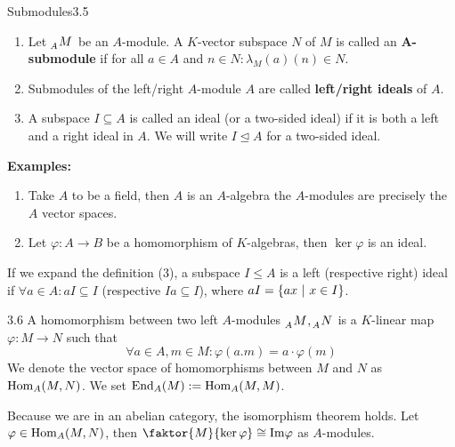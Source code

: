 \documentclass[twoside = false,	%
		headsepline,		%
		parskip = true,
		]{scrbook}						%
\begin{document}
        \begin{definition}{Submodules}{3.5}
            \begin{enumerate}
                \item
                    Let $\tensor[_A]{M}{}$ be an $A$-module. A $K$-vector subspace $N$ of $M$ is called an $\mathbf{A}$\textbf{-submodule} if for all $a \in A$ and $n \in N: \lambda_M(a)(n) \in N$.
                \item
                    Submodules of the left/right $A$-module $A$ are called \textbf{left/right ideals} of $A$.
                \item
                    A subspace $I \subseteq A$ is called an ideal (or a two-sided ideal) if it is both a left and a right ideal in $A$. We will write $I \trianglelefteq A$ for a two-sided ideal.
            \end{enumerate}
        \end{definition}

        \textbf{Examples:}
        \begin{enumerate}
            \item Take $A$ to be a field, then $A$ is an $A$-algebra the $A$-modules are precisely the $A$ vector spaces.
            \item Let $\varphi: A \to B$ be a homomorphism of $K$-algebras, then $\ker \varphi$ is an ideal.
        \end{enumerate}

        If we expand the definition (3), a subspace $I \leq A$ is a left (respective right) ideal if $\forall a \in A: aI \subseteq I$ (respective $Ia \subseteq I$), where $aI = \left\{ ax \ | \ x \in I\right\}$.

        \begin{definition}{}{3.6}
            A homomorphism between two left $A$-modules $\tensor[_A]{M}{},\tensor[_A]{N}{}$ is a $K$-linear map $\varphi: M \to N$ such that
            \begin{equation*}
                \forall a \in A, m \in M: \varphi(a.m) = a \cdot \varphi(m)
            \end{equation*}
            We denote the vector space of homomorphisms between $M$ and $N$ as $\mathrm{Hom}_A(M,N)$. We set $\mathrm{End}_A(M):= \mathrm{Hom}_A(M,M)$.
        \end{definition}

        Because we are in an abelian category, the isomorphism theorem holds. Let $\varphi \in \mathrm{Hom}_A(M,N)$, then $\faktor{M}{\ker \varphi} \cong \Img \varphi$ as $A$-modules.
\end{document}
